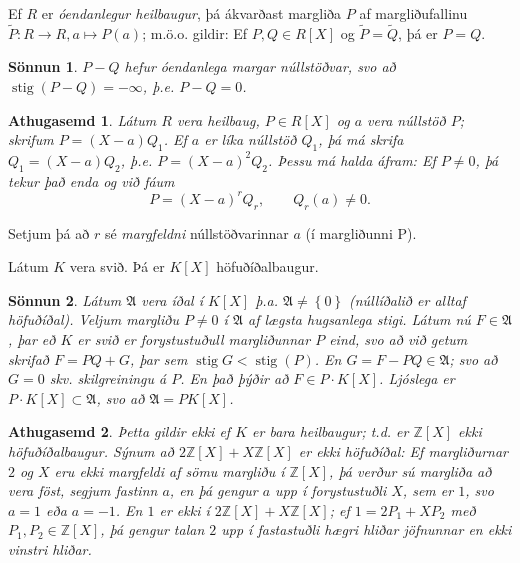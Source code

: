 \documentclass[a4paper,icelandic,11pt]{book}
\theoremstyle{plain}
\newtheorem*{ath}{Athugasemd}
\newtheorem*{sonnun}{Sönnun}
\newcommand{\Z}{\mathbb{Z}}
\DeclareMathOperator{\stig}{stig} %
\begin{document}
\begin{fylgisetn}
  Ef $R$ er \emph{óendanlegur heilbaugur}, þá ákvarðast margliða $P$ af
  margliðufallinu $\tilde P: R\to R,a\mapsto P(a)$; m.ö.o. gildir: Ef $P,Q\in
  R[X]$ og $\tilde P = \tilde Q$, þá er $P=Q$.
\end{fylgisetn}
\begin{sonnun}
  $P-Q$ hefur óendanlega margar núllstöðvar, svo að $\stig(P-Q)=-\infty$, þ.e.
  $P-Q=0$.
\end{sonnun}
\begin{ath}
  Látum $R$ vera heilbaug, $P\in R[X]$ og $a$ vera núllstöð $P$; skrifum
  $P=(X-a)Q_1$. Ef $a$ er líka núllstöð $Q_1$, þá má skrifa $Q_1 = (X-a)Q_2$,
  þ.e. $P=(X-a)^2Q_2$. Þessu má halda áfram: Ef $P\neq 0$, þá tekur það enda og
  við fáum \[
  P = (X-a)^r Q_r, \qquad Q_r(a)\neq 0.
  \]
\end{ath}
Setjum þá að $r$ sé \emph{margfeldni}
núllstöðvarinnar $a$ (í margliðunni P).
\begin{setn}
  Látum $K$ vera svið. Þá er $K[X]$ höfuðíðalbaugur.
\end{setn}
\begin{sonnun}
  Látum $\mathfrak A$ vera íðal í $K[X]$ þ.a. $\mathfrak A\neq \left\{ 0
  \right\}$ (núllíðalið er alltaf höfuðíðal). Veljum margliðu $P\neq 0$ í
  $\mathfrak A$ af lægsta hugsanlega stigi. Látum nú $F\in \mathfrak A$, þar eð
  $K$ er svið er forystustuðull margliðunnar $P$ eind, svo að við getum skrifað
  $F=PQ+G$, þar sem $\stig G<\stig(P)$. En $G=F-PQ\in\mathfrak A$; svo að
  $G=0$ skv. skilgreiningu á $P$. En það þýðir að $F\in P\cdot K[X]$. Ljóslega
  er $P\cdot K[X]\subset \mathfrak A$, svo að $\mathfrak A=PK[X]$.
\end{sonnun}
\begin{ath}
  Þetta gildir ekki ef $K$ er bara heilbaugur; t.d. er $\Z[X]$ ekki
  höfuðíðalbaugur. Sýnum að $2\Z[X]+X\Z[X]$ er ekki höfuðíðal: Ef margliðurnar
  $2$ og $X$ eru ekki margfeldi af sömu margliðu í $\Z[X]$, þá verður sú
  margliða að vera föst, segjum fastinn $a$, en þá gengur $a$ upp í
  forystustuðli $X$, sem er $1$, svo $a=1$ eða $a=-1$. En $1$ er ekki í
  $2\Z[X]+X\Z[X]$; ef $1=2P_1+XP_2$ með $P_1,P_2\in\Z[X]$, þá gengur talan
  $2$ upp í fastastuðli hægri hliðar jöfnunnar en ekki vinstri hliðar.
\end{ath}
\end{document}
